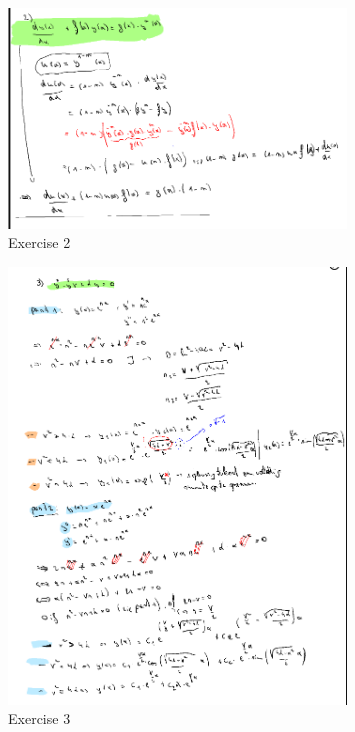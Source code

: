 \documentclass[a4paper]{report}
\begin{document}
\begin{figure}[H]
	\centering
	\includegraphics[width=0.8\textwidth]{assets/exercise_2_huis_8.png}
	\caption{Exercise 2}
	\label{fig:exercise_2_huis_8}
\end{figure}


\begin{figure}[H]
	\centering
	\includegraphics[width=0.8\textwidth]{assets/exercise_3_huis_8.png}
	\caption{Exercise 3}
	\label{fig:exercise_3_huis_8}
\end{figure}
\end{document}
